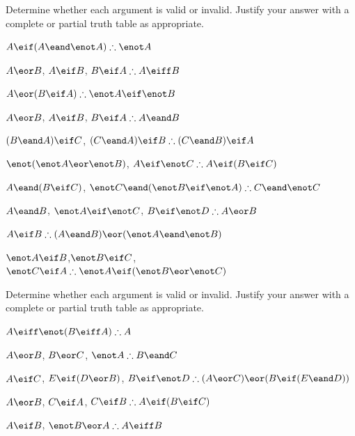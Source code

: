 \noindent\problempart Determine whether each argument is valid or invalid. Justify your answer with a complete or partial truth table as appropriate.
\label{pr.TT.valid5} 
\begin{compactlist}
\item $A\eif(A\eand\enot A)\therefore \enot A$ \hfill {}
\item $A \eor B$, $A \eif B$, $B \eif A \therefore  A \eiff B$  \hfill {}
\item $A\eor(B\eif A)\therefore \enot A \eif \enot B$ \hfill {}
\item $A \eor B$, $A \eif B$, $ B \eif A \therefore  A \eand B$ \hfill {}
\item $(B\eand A)\eif C$, $(C\eand A)\eif B\therefore (C\eand B)\eif A$ \hfill {}
\item $\enot (\enot A \eor \enot B)$, $A \eif \enot C \therefore  A \eif (B \eif C)$ \hfill {}
\item $A \eand (B \eif C)$, $\enot C \eand (\enot B \eif \enot A)\therefore C \eand \enot C$ \hfill {}
\item $A \eand B$, $\enot A \eif \enot C$, $B \eif \enot D \therefore  A \eor B$ \hfill {}
\item $A \eif B\therefore (A \eand B) \eor (\enot A \eand \enot B)$ \hfill {}
\item $\enot A \eif B$,$ \enot B \eif C $,$ \enot C \eif A \therefore  \enot A \eif (\enot B \eor \enot C)$ \hfill {}

\end{compactlist}

\noindent\problempart Determine whether each argument is valid or invalid. Justify your answer with a complete or partial truth table as appropriate.
\label{pr.TT.valid6} 
\begin{compactlist}
\item $A\eiff\enot(B\eiff A)\therefore A$ \hfill {}
\item $A\eor B$, $B\eor C$, $\enot A\therefore B \eand C$ \hfill {}
\item $A \eif C$, $E \eif (D \eor B)$, $B \eif \enot D\therefore (A \eor C) \eor (B \eif (E \eand D))$ \hfill {}
\item $A \eor B$, $C \eif A$, $C \eif B\therefore A \eif (B \eif C)$ \hfill {}
\item $A \eif B$, $\enot B \eor A\therefore A \eiff B$ \hfill {}
\end{compactlist}

